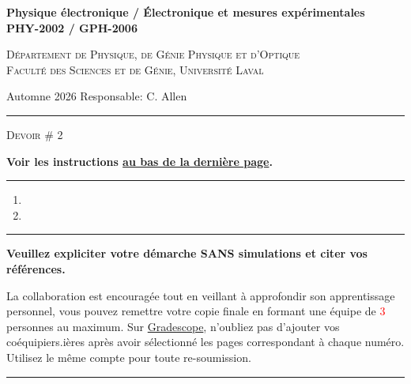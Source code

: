 \documentclass[english,french,12pt]{article}
\begin{document}
\renewcommand{\onlyinsubfile}[1]{}
%
%
\begin{center}
    \textbf{\large{Physique électronique / Électronique et mesures expérimentales}}\\
    \vspace{0.2em}
    \textbf{PHY-2002 / GPH-2006}\par
    \textsc{Département de Physique, de Génie Physique et d'Optique\\
    Faculté des Sciences et de Génie, Université Laval}
\end{center}
\noindent Automne 2026 \hfill Responsable: C. Allen
\vspace{0.2em}
\hrule
\vspace{-0.5ex}
\begin{center}
    \textsc{Devoir \# 2}\par
    \small{\textbf{Voir les instructions \hyperref[instructions]{au bas de la dernière page}.}}
\end{center}
\vspace{-1.2ex}
\hrule
\justify

%

\begin{enumerate}[label=\Roman*., wide, labelwidth=!, labelindent=0pt]
    \setcounter{enumi}{0}
    \vspace{2ex}
    \item 
    \newpage
    \item 
\end{enumerate}
 
\vfill
\hrule
\vspace{0.3em}
\centering
\textbf{Veuillez expliciter votre démarche SANS simulations et citer vos références.}\par
\vspace{-0.3em}
La collaboration est encouragée tout en veillant à approfondir son apprentissage personnel, vous pouvez remettre votre copie finale en formant une équipe de \textcolor{red}{3} personnes au maximum. Sur \href{https://www.gradescope.com/}{Gradescope}, n'oubliez pas d'ajouter vos coéquipiers.ières après avoir sélectionné les pages correspondant à chaque numéro. Utilisez le même compte pour toute re-soumission.\par
\vspace{1em}
\hrule
\label{instructions}
\end{document}
